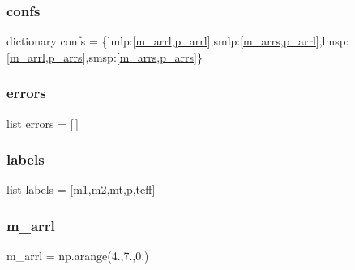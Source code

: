 \subsubsection{\texorpdfstring{confs}{confs}}
{\footnotesize\ttfamily dictionary confs = \{\textquotesingle{}lmlp\textquotesingle{}\+:\mbox{[}\hyperlink{namespacequery_aafb51e0017c73f87bbe2699321c6a5fd}{m\+\_\+arrl},\hyperlink{namespacequery_aa2c4078b994af1c9ad5f0821590d0eea}{p\+\_\+arrl}\mbox{]},\textquotesingle{}smlp\textquotesingle{}\+:\mbox{[}\hyperlink{namespacequery_ac323a9cbb94178daa2549f554bd92baa}{m\+\_\+arrs},\hyperlink{namespacequery_aa2c4078b994af1c9ad5f0821590d0eea}{p\+\_\+arrl}\mbox{]},\textquotesingle{}lmsp\textquotesingle{}\+:\mbox{[}\hyperlink{namespacequery_aafb51e0017c73f87bbe2699321c6a5fd}{m\+\_\+arrl},\hyperlink{namespacequery_acb09178e64b20ef1abc8365eba1ca4fc}{p\+\_\+arrs}\mbox{]},\textquotesingle{}smsp\textquotesingle{}\+:\mbox{[}\hyperlink{namespacequery_ac323a9cbb94178daa2549f554bd92baa}{m\+\_\+arrs},\hyperlink{namespacequery_acb09178e64b20ef1abc8365eba1ca4fc}{p\+\_\+arrs}\mbox{]}\}}

\mbox{\label{namespacequery_adf94822c1d3c878c7e35db9412bb1d66}} 
\subsubsection{\texorpdfstring{errors}{errors}}
{\footnotesize\ttfamily list errors = \mbox{[}$\,$\mbox{]}}

\mbox{\label{namespacequery_a0f59db5220a1b7eca136f6e360055d03}} 
\subsubsection{\texorpdfstring{labels}{labels}}
{\footnotesize\ttfamily list labels = \mbox{[}\textquotesingle{}m1\textquotesingle{},\textquotesingle{}m2\textquotesingle{},\textquotesingle{}mt\textquotesingle{},\textquotesingle{}p\textquotesingle{},\textquotesingle{}teff\textquotesingle{}\mbox{]}}

\mbox{\label{namespacequery_aafb51e0017c73f87bbe2699321c6a5fd}} 
\subsubsection{\texorpdfstring{m\+\_\+arrl}{m\_arrl}}
{\footnotesize\ttfamily m\+\_\+arrl = np.\+arange(4.,7.,0.)}

